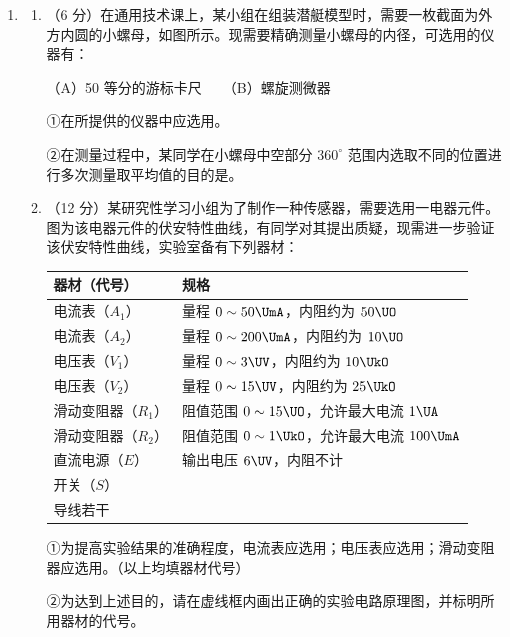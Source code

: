 \documentclass[\gkver]{gaokaozhenti}
\begin{document}
\begin{enumerate}
\item
\begin{enumerate}
	\item
	（6 分）在通用技术课上，某小组在组装潜艇模型时，需要一枚截面为外方内圆的小螺母，如图所示。现需要精确测量小螺母的内径，可选用的仪器有：

	（A）50 等分的游标卡尺　　（B）螺旋测微器

	①在所提供的仪器中应选用\tkanswer[1.2cm]{}。

	②在测量过程中，某同学在小螺母中空部分 $360^\circ$ 范围内选取不同的位置进行多次测量取平均值的目的是\tkanswer[3cm]{}。

	\item
	（12 分）某研究性学习小组为了制作一种传感器，需要选用一电器元件。图为该电器元件的伏安特性曲线，有同学对其提出质疑，现需进一步验证该伏安特性曲线，实验室备有下列器材：

	\begin{center}
	\begin{tabular}{|l|l|}
	\hline
	器材（代号） & 规格 \\ \hline
	电流表（$A_{1}$） & 量程 $0\sim50\UmA$，内阻约为 $50\UO$ \\
	电流表（$A_{2}$） & 量程 $0\sim200\UmA$，内阻约为 $10\UO$ \\
	电压表（$V_{1}$） & 量程 $0\sim3\UV$，内阻约为 $10\UkO$ \\
	电压表（$V_{2}$） & 量程 $0\sim15\UV$，内阻约为 $25\UkO$ \\
	滑动变阻器（$R_{1}$） & 阻值范围 $0\sim15\UO$，允许最大电流 $1\UA$ \\
	滑动变阻器（$R_{2}$） & 阻值范围 $0\sim1\UkO$，允许最大电流 $100\UmA$ \\
	直流电源（$E$） & 输出电压 $6\UV$，内阻不计 \\
	开关（$S$） & \\
	导线若干 & \\ \hline
	\end{tabular}
	\end{center}

	①为提高实验结果的准确程度，电流表应选用\tkanswer[1cm]{}；电压表应选用\tkanswer[1cm]{}；滑动变阻器应选用\tkanswer[1.5cm]{}。（以上均填器材代号）

	②为达到上述目的，请在虚线框内画出正确的实验电路原理图，并标明所用器材的代号。


\end{enumerate}
\end{enumerate}
\end{document}
